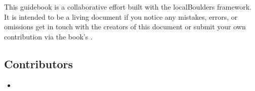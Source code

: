 This guidebook is a collaborative effort built with the localBoulders framework. It is intended to be a living document if you notice any mistakes, errors, or omissions get in touch with the creators of this document or submit your own contribution via the book's .
\subsection*{Contributors}
\begin{itemize}
\item {}
\end{itemize}
\clearpage